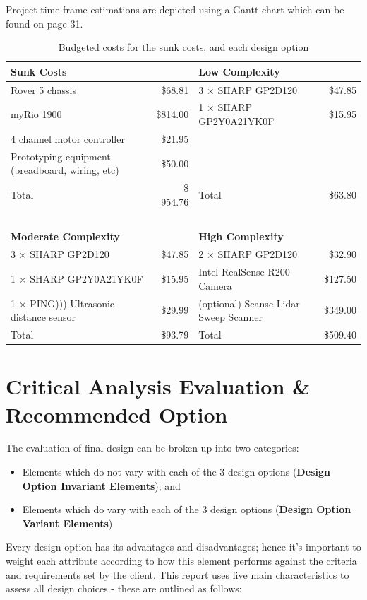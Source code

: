 \documentclass[a4paper]{article}
\begin{document}
Project time frame estimations are depicted using a Gantt chart which can be found on page 31.
\begin{table}[h]
\centering
\caption{Budgeted costs for the sunk costs, and each design option}
\begin{tabular}{p{6cm}rp{6cm}r}
\toprule
\textbf{Sunk Costs} & & \textbf{Low Complexity} & \\
\midrule
Rover 5 chassis & \$68.81 & 3 $\times$ SHARP GP2D120 & \$47.85 \\
myRio 1900 & \$814.00 & 1 $\times$ SHARP GP2Y0A21YK0F & \$15.95 \\
4 channel motor controller & \$21.95 &  & \\
Prototyping equipment (breadboard, wiring, etc) & \$50.00 & & \\
\midrule
Total & \$ 954.76 & Total & \$63.80 \\
\midrule
\ & & & \\
\midrule
\textbf{Moderate Complexity} & & \textbf{High Complexity} & \\
\midrule
3 $\times$ SHARP GP2D120 & \$47.85 & 2 $\times$ SHARP GP2D120 & \$32.90 \\
1 $\times$ SHARP GP2Y0A21YK0F & \$15.95 & Intel RealSense R200 Camera & \$127.50 \\
1 $\times$ PING))) Ultrasonic distance sensor & \$29.99 & (optional) Scanse Lidar Sweep Scanner & \$349.00 \\
\midrule
Total & \$93.79 & Total & \$509.40 \\
\bottomrule
\end{tabular}
\end{table}

\newpage

\section{Critical Analysis Evaluation \& Recommended Option}
The evaluation of final design can be broken up into two categories:
\begin{itemize}
\item Elements which do not vary with each of the 3 design options (\textbf{Design Option Invariant Elements}); and
\item Elements which do vary with each of the 3 design options (\textbf{Design Option Variant Elements}) 
\end{itemize}
Every design option has its advantages and disadvantages; hence it’s important to weight each attribute according to how this element performs against the criteria and requirements set by the client. This report uses five main characteristics to assess all design choices - these are outlined as follows:
\end{document}
